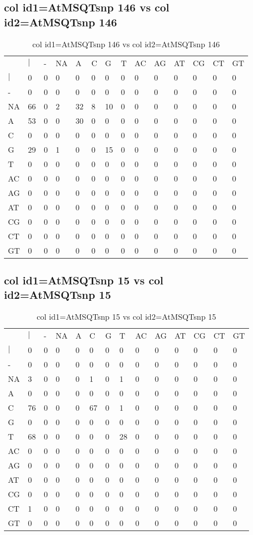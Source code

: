 \subsection{col id1=AtMSQTsnp 146 vs col id2=AtMSQTsnp 146}
\begin{center}
\begin{longtable}{|l|l|l|l|l|l|l|l|l|l|l|l|l|l|}
\caption{col id1=AtMSQTsnp 146 vs col id2=AtMSQTsnp 146} \label{table_dm536}\\
\hline
\\
\hline
&$|$&-&NA&A&C&G&T&AC&AG&AT&CG&CT&GT\\
$|$&0&0&0&0&0&0&0&0&0&0&0&0&0\\
-&0&0&0&0&0&0&0&0&0&0&0&0&0\\
NA&66&0&2&32&8&10&0&0&0&0&0&0&0\\
A&53&0&0&30&0&0&0&0&0&0&0&0&0\\
C&0&0&0&0&0&0&0&0&0&0&0&0&0\\
G&29&0&1&0&0&15&0&0&0&0&0&0&0\\
T&0&0&0&0&0&0&0&0&0&0&0&0&0\\
AC&0&0&0&0&0&0&0&0&0&0&0&0&0\\
AG&0&0&0&0&0&0&0&0&0&0&0&0&0\\
AT&0&0&0&0&0&0&0&0&0&0&0&0&0\\
CG&0&0&0&0&0&0&0&0&0&0&0&0&0\\
CT&0&0&0&0&0&0&0&0&0&0&0&0&0\\
GT&0&0&0&0&0&0&0&0&0&0&0&0&0\\
\hline
\end{longtable}
\end{center}

\subsection{col id1=AtMSQTsnp 15 vs col id2=AtMSQTsnp 15}
\begin{center}
\begin{longtable}{|l|l|l|l|l|l|l|l|l|l|l|l|l|l|}
\caption{col id1=AtMSQTsnp 15 vs col id2=AtMSQTsnp 15} \label{table_dm538}\\
\hline
\\
\hline
&$|$&-&NA&A&C&G&T&AC&AG&AT&CG&CT&GT\\
$|$&0&0&0&0&0&0&0&0&0&0&0&0&0\\
-&0&0&0&0&0&0&0&0&0&0&0&0&0\\
NA&3&0&0&0&1&0&1&0&0&0&0&0&0\\
A&0&0&0&0&0&0&0&0&0&0&0&0&0\\
C&76&0&0&0&67&0&1&0&0&0&0&0&0\\
G&0&0&0&0&0&0&0&0&0&0&0&0&0\\
T&68&0&0&0&0&0&28&0&0&0&0&0&0\\
AC&0&0&0&0&0&0&0&0&0&0&0&0&0\\
AG&0&0&0&0&0&0&0&0&0&0&0&0&0\\
AT&0&0&0&0&0&0&0&0&0&0&0&0&0\\
CG&0&0&0&0&0&0&0&0&0&0&0&0&0\\
CT&1&0&0&0&0&0&0&0&0&0&0&0&0\\
GT&0&0&0&0&0&0&0&0&0&0&0&0&0\\
\hline
\end{longtable}
\end{center}

